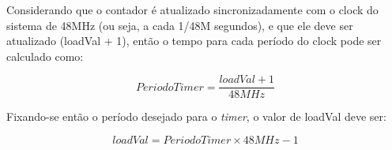 Considerando que o contador é atualizado sincronizadamente com o clock do sistema de 48MHz (ou seja, a cada 1/48M segundos), e que ele deve ser atualizado (loadVal + 1), então o tempo para cada período do clock pode ser calculado como:

\begin{equation}
PeriodoTimer = \dfrac{loadVal + 1}{48MHz}
\end{equation}

Fixando-se então o período desejado para o \emph{timer}, o valor de loadVal deve ser:

\begin{equation}
loadVal = PeriodoTimer \times 48MHz - 1
\end{equation}
